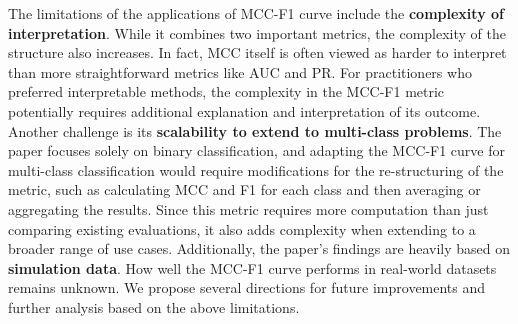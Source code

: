 \documentclass[12pt, oneside]{amsart}
\theoremstyle{definition}
\theoremstyle{remark}
\numberwithin{equation}{section}
\begin{document}
The limitations of the applications of MCC-F1 curve include the \textbf{complexity of interpretation}. While it combines two important metrics, the complexity of the structure also increases. In fact, MCC itself is often viewed as harder to interpret than more straightforward metrics like AUC and PR. For practitioners who preferred interpretable methods, the complexity in the MCC-F1 metric potentially requires additional explanation and interpretation of its outcome. Another challenge is its \textbf{scalability to extend to multi-class problems}. The paper focuses solely on binary classification, and adapting the MCC-F1 curve for multi-class classification would require modifications for the re-structuring of the metric, such as calculating MCC and F1 for each class and then averaging or aggregating the results. Since this metric requires more computation than just comparing existing evaluations, it also adds complexity when extending to a broader range of use cases. Additionally, the paper's findings are heavily based on \textbf{simulation data}. How well the MCC-F1 curve performs in real-world datasets remains unknown. We propose several directions for future improvements and further analysis based on the above limitations.
\end{document}
